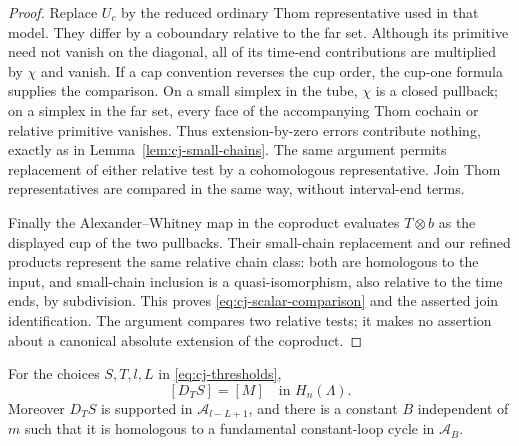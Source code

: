\begin{proof}
Replace $U_c$ by the reduced ordinary Thom representative used
in that model.  They differ by a coboundary relative to the
far set.  Although its primitive need not vanish on the diagonal,
all of its time-end contributions are multiplied by $\chi$
and vanish.  If a cap convention reverses the cup order, the
cup-one formula supplies the comparison.  On a small simplex in
the tube, $\chi$ is a closed pullback; on a simplex in the
far set, every face of the accompanying Thom cochain or relative
primitive vanishes.  Thus extension-by-zero errors contribute
nothing, exactly as in Lemma~\ref{lem:cj-small-chains}.
The same argument permits replacement of either relative test
by a cohomologous representative.  Join Thom representatives
are compared in the same way, without interval-end terms.

Finally the Alexander--Whitney map in the coproduct evaluates
$T\otimes b$ as the displayed cup of the two pullbacks.
Their small-chain replacement and our refined products
represent the same relative chain class: both are homologous
to the input, and small-chain inclusion is a quasi-isomorphism,
also relative to the time ends, by subdivision.  This proves
\eqref{eq:cj-scalar-comparison} and the asserted join
identification.  The argument compares two relative tests;
it makes no assertion about a canonical absolute extension of
the coproduct.
\end{proof}

\begin{proposition}
\label{prop:absolute-unit}
For the choices $S,T,l,L$ in \eqref{eq:cj-thresholds},
\begin{equation}\label{eq:cj-absolute-unit}
 [D_TS]=[M]\quad\text{in }H_n(\Lambda).
\end{equation}
Moreover $D_TS$ is supported in $\mathcal A_{l-L+1}$, and there is a
constant $B$ independent of $m$ such that it is homologous to a
fundamental constant-loop cycle in $\mathcal A_B$.
\end{proposition}

